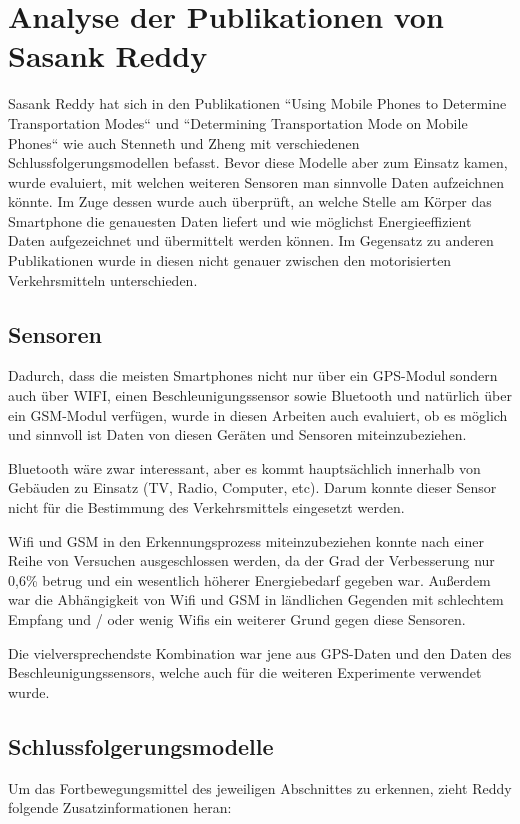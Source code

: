 \section{Analyse der Publikationen von Sasank Reddy}
Sasank Reddy hat sich in den Publikationen ``Using Mobile Phones to Determine Transportation Modes`` \cite{reddy_using_2010} und ``Determining Transportation Mode on Mobile Phones`` \cite{reddy_determining_2008} wie auch Stenneth und Zheng mit verschiedenen Schlussfolgerungsmodellen befasst. Bevor diese Modelle aber zum Einsatz kamen, wurde evaluiert, mit welchen weiteren Sensoren man sinnvolle Daten aufzeichnen könnte. Im Zuge dessen wurde auch überprüft, an welche Stelle am Körper das Smartphone die genauesten Daten liefert und wie möglichst Energieeffizient Daten aufgezeichnet und übermittelt werden können. Im Gegensatz zu anderen Publikationen wurde in diesen nicht genauer zwischen den motorisierten Verkehrsmitteln unterschieden.

\subsection{Sensoren}
Dadurch, dass die meisten Smartphones nicht nur über ein GPS-Modul sondern auch über WIFI, einen Beschleunigungssensor sowie Bluetooth und natürlich über ein GSM-Modul verfügen, wurde in diesen Arbeiten auch evaluiert, ob es möglich und sinnvoll ist Daten von diesen Geräten und Sensoren miteinzubeziehen. 

Bluetooth  wäre zwar interessant, aber es kommt hauptsächlich innerhalb von Gebäuden zu Einsatz (TV, Radio, Computer, etc). Darum konnte dieser Sensor nicht für die Bestimmung des Verkehrsmittels eingesetzt werden. 

Wifi und GSM in den Erkennungsprozess miteinzubeziehen konnte nach einer Reihe von Versuchen ausgeschlossen werden, da der Grad der Verbesserung nur 0,6\% betrug und ein wesentlich höherer Energiebedarf gegeben war. Außerdem war die Abhängigkeit von Wifi und GSM in ländlichen Gegenden mit schlechtem Empfang und / oder wenig Wifis ein weiterer Grund gegen diese Sensoren.

Die vielversprechendste Kombination war jene aus GPS-Daten und den Daten des Beschleunigungssensors, welche auch  für die weiteren Experimente verwendet wurde.

\subsection{Schlussfolgerungsmodelle}
Um das Fortbewegungsmittel des jeweiligen Abschnittes zu erkennen, zieht Reddy folgende Zusatzinformationen heran:

